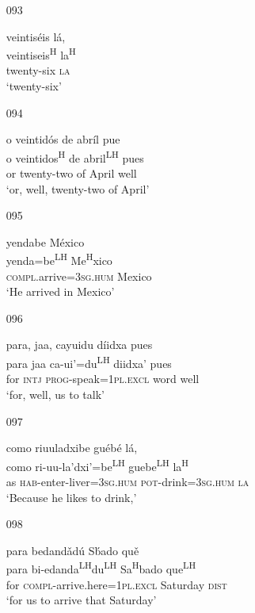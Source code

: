 \begin{itemize}
\item[093]
 
\glll   veintis\'{e}is l\'{a},  \\
 veintiseis\textsuperscript{H} la\textsuperscript{H} \\
 twenty-six \textsc{la} \\
\glt `twenty-six'
 


\item[094]
 
\glll   o veintid\'{o}s de abr\'{i}l pue \\
o veintidos\textsuperscript{H} de abril\textsuperscript{LH} pues \\
 or twenty-two of April well \\
\glt `or, well, twenty-two of April'
 


\item[095]
 
\glll   yendabe M\'{e}xico  \\
yenda=be\textsuperscript{LH} Me\textsuperscript{H}xico \\
\textsc{compl}.arrive=\textsc{3sg.hum} Mexico \\
\glt `He arrived in Mexico'
 

\item[096]
 
\glll   para, jaa, cayuidu d\'{i}idxa pues  \\
para jaa ca-ui'=du\textsuperscript{LH} diidxa' pues  \\
for \textsc{intj} \textsc{prog}-speak=\textsc{1pl.excl} word well \\
\glt `for, well, us to talk'
 

\item[097]
 
\glll   como riuuladxibe gu\'{e}b\'{e} l\'{a}, \\
como ri-uu-la'dxi'=be\textsuperscript{LH} guebe\textsuperscript{LH} la\textsuperscript{H} \\
as \textsc{hab}-enter-liver=\textsc{3sg.hum} \textsc{pot}-drink=\textsc{3sg.hum} \textsc{la} \\
\glt `Because he likes to drink,'
 

\item[098]
 
\glll   para bedand\v{a}d\'{u} S\'{b}ado qu\v{e}  \\
para bi-edanda\textsuperscript{LH}du\textsuperscript{LH} Sa\textsuperscript{H}bado que\textsuperscript{LH}  \\
for \textsc{compl}-arrive.here=\textsc{1pl.excl} Saturday \textsc{dist} \\
\glt `for us to arrive that Saturday'
 



\end{itemize}
